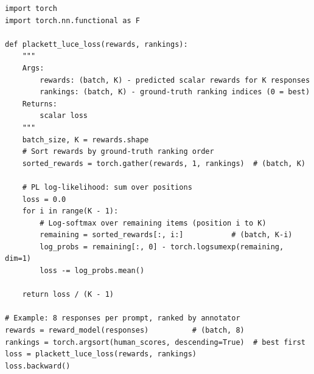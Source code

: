 \begin{examplebox}
\begin{lstlisting}[style=pythonstyle]
import torch
import torch.nn.functional as F

def plackett_luce_loss(rewards, rankings):
    """
    Args:
        rewards: (batch, K) - predicted scalar rewards for K responses
        rankings: (batch, K) - ground-truth ranking indices (0 = best)
    Returns:
        scalar loss
    """
    batch_size, K = rewards.shape
    # Sort rewards by ground-truth ranking order
    sorted_rewards = torch.gather(rewards, 1, rankings)  # (batch, K)
    
    # PL log-likelihood: sum over positions
    loss = 0.0
    for i in range(K - 1):
        # Log-softmax over remaining items (position i to K)
        remaining = sorted_rewards[:, i:]           # (batch, K-i)
        log_probs = remaining[:, 0] - torch.logsumexp(remaining, dim=1)
        loss -= log_probs.mean()
    
    return loss / (K - 1)

# Example: 8 responses per prompt, ranked by annotator
rewards = reward_model(responses)          # (batch, 8)
rankings = torch.argsort(human_scores, descending=True)  # best first
loss = plackett_luce_loss(rewards, rankings)
loss.backward()
\end{lstlisting}
\end{examplebox}

